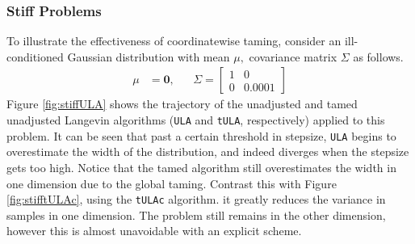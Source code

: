 \subsubsection{Stiff Problems}
To illustrate the effectiveness of coordinatewise taming, consider an ill-conditioned Gaussian distribution with mean \(\mu,\) covariance matrix \(\Sigma\) as follows.
\begin{align*}
    \mu &= \mathbf{0}, && \Sigma = \begin{bmatrix}  1 & 0 \\ 0 & 0.0001 \end{bmatrix}
\end{align*}
Figure \ref{fig:stiffULA} shows the trajectory of the unadjusted and tamed unadjusted Langevin algorithms (\texttt{ULA} and \texttt{tULA}, respectively) applied to this problem. It can be seen that past a certain threshold in stepsize, \texttt{ULA} begins to overestimate the width of the distribution, and indeed diverges when the stepsize gets too high. Notice that the tamed algorithm still overestimates the width in one dimension due to the global taming. Contrast this with Figure \ref{fig:stifftULAc}, using the \texttt{tULAc} algorithm. it greatly reduces the variance in samples in one dimension. The problem still remains in the other dimension, however this is almost unavoidable with an explicit scheme.  
